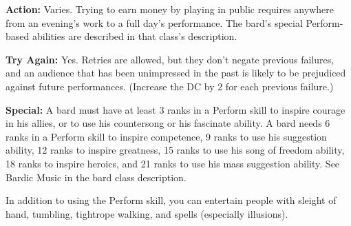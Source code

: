 \textbf{Action:} Varies. Trying to earn money by playing in public requires anywhere from an evening's work to a full day's performance. The bard's special Perform-based abilities are described in that class's description.

\textbf{Try Again:} Yes. Retries are allowed, but they don't negate previous failures, and an audience that has been unimpressed in the past is likely to be prejudiced against future performances. (Increase the DC by 2 for each previous failure.)

\textbf{Special:} A bard must have at least 3 ranks in a Perform skill to inspire courage in his allies, or to use his countersong or his fascinate ability. A bard needs 6 ranks in a Perform skill to inspire competence, 9 ranks to use his suggestion ability, 12 ranks to inspire greatness, 15 ranks to use his song of freedom ability, 18 ranks to inspire heroics, and 21 ranks to use his mass suggestion ability. See Bardic Music in the bard class description.

In addition to using the Perform skill, you can entertain people with sleight of hand, tumbling, tightrope walking, and spells (especially illusions).


